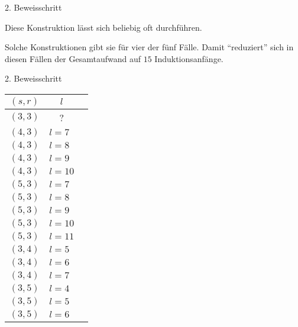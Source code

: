 \documentclass[10pt, notheorems]{beamer}
\begin{document}
\begin{frame}[fragile]{2. Beweisschritt}{}
\begin{example}
{
      \par }
    Diese Konstruktion lässt sich beliebig oft durchführen.
  \end{example}
  \pause
  Solche Konstruktionen gibt sie für vier der fünf Fälle. Damit ``reduziert'' sich in diesen Fällen der Gesamtaufwand auf $15$ Induktionsanfänge.
\end{frame}

\begin{frame}{2. Beweisschritt}
  \begin{tabularx}{\textwidth}{|c|l|X|}
    \hline
    $(s, r)$ & \multicolumn{1}{c|}{$l$} &\\
    \hline
    $(3, 3)$ & \multicolumn{1}{c|}{?} & \\
    $(4, 3)$ & $l = 7$ &\\
    $(4, 3)$ & $l = 8$ &\\
    $(4, 3)$ & $l = 9$ &\\
    $(4, 3)$ & $l = 10$ &\\
    $(5, 3)$ & $l = 7$ &\\
    $(5, 3)$ & $l = 8$ &\\
    $(5, 3)$ & $l = 9$ &\\
    $(5, 3)$ & $l = 10$ &\\
    $(5, 3)$ & $l = 11$ &\\
    $(3, 4)$ & $l = 5$ &\\
    $(3, 4)$ & $l = 6$ &\\
    $(3, 4)$ & $l = 7$ &\\
    $(3, 5)$ & $l = 4$ &\\
    $(3, 5)$ & $l = 5$ &\\
    $(3, 5)$ & $l = 6$ &\\
    \hline
  \end{tabularx}
\end{frame}
\end{document}
